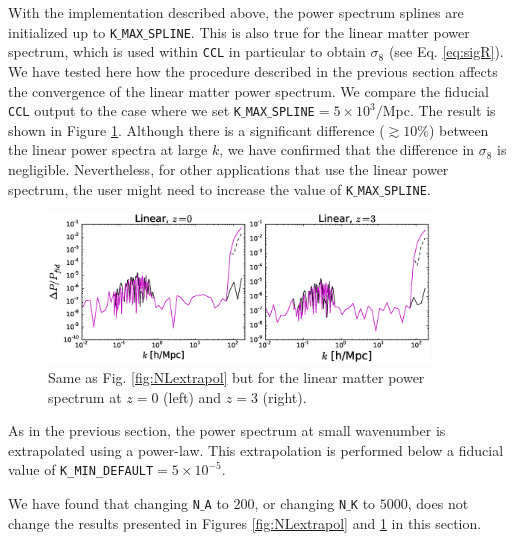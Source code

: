 \documentclass[\docopts]{\docclass}
\newcommand{\ccl}{{\tt CCL}\xspace}
\begin{document}
With the implementation described above, the power spectrum splines are initialized up to {\tt K$\_$MAX$\_$SPLINE}. This is also true for the linear matter power spectrum, which is used within \ccl in particular to obtain $\sigma_8$ (see Eq. \ref{eq:sigR}). We have tested here how the procedure described in the previous section affects the convergence of the linear matter power spectrum. We compare the fiducial \ccl output to the case where we set {\tt K$\_$MAX$\_$SPLINE}$=5\times 10^3/$Mpc. The result is shown in Figure \ref{fig:Lextrapol}. Although there is a significant difference ($\gtrsim 10\%$) between the linear power spectra at large $k$, we have confirmed that the difference in $\sigma_8$ is negligible. Nevertheless, for other applications that use the linear power spectrum, the user might need to increase the value of {\tt K$\_$MAX$\_$SPLINE}.

\begin{figure}
\centering
\includegraphics[width=0.9\textwidth]{PS_converge_lin.eps}
\caption{Same as Fig. \ref{fig:NLextrapol} but for the linear matter power spectrum at $z=0$ (left) and $z=3$ (right).}
\label{fig:Lextrapol}
\end{figure}

As in the previous section, the power spectrum at small wavenumber is extrapolated using a power-law. This extrapolation is performed below a fiducial value of {\tt K\_MIN\_DEFAULT}$=5\times 10^{-5}$.

We have found that changing {\tt N$\_$A} to $200$, or changing {\tt N$\_$K} to $5000$, does not change the results presented in Figures \ref{fig:NLextrapol} and \ref{fig:Lextrapol} in this section.

\end{document}
